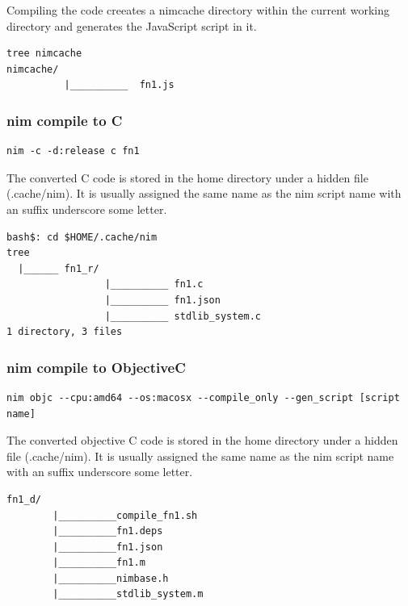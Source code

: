 \documentclass[10pt, a4paper, twocolumn]{article} %
\begin{document}
Compiling the code creeates a nimcache directory within the current working directory and generates the JavaScript script in it.

\begin{lstlisting}
tree nimcache
nimcache/
		  |__________  fn1.js
\end{lstlisting}

\subsubsection{nim compile to C}



\begin{lstlisting}
nim -c -d:release c fn1
\end{lstlisting}

The converted C code is stored in the home directory under a hidden file (.cache/nim). It is usually assigned the same name as the nim script name with an suffix underscore some letter.

\begin{lstlisting}
bash$: cd $HOME/.cache/nim
tree 
  |______ fn1_r/
    	     	 |__________ fn1.c
		 		 |__________ fn1.json
		 		 |__________ stdlib_system.c
1 directory, 3 files
\end{lstlisting}

\subsubsection{nim compile to ObjectiveC}

\begin{lstlisting}
nim objc --cpu:amd64 --os:macosx --compile_only --gen_script [script name] 
\end{lstlisting}

The converted objective C code is stored in the home directory under a hidden file (.cache/nim). It is usually assigned the same name as the nim script name with an suffix underscore some letter.

\begin{lstlisting}
fn1_d/
		|__________compile_fn1.sh
		|__________fn1.deps
		|__________fn1.json
		|__________fn1.m
		|__________nimbase.h
		|__________stdlib_system.m
\end{lstlisting}


\printbibliography[title={Bibliography}] %

\end{document}
